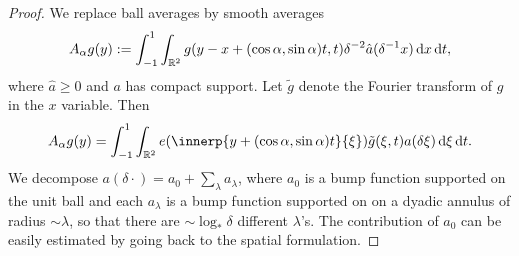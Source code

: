 \begin{proof}
We replace ball averages by smooth averages
\[
A_{\alpha}g(y)
:=
\int_{-1}^{1} \int_{\mathbb{R}^{2}} g(y-x+(\cos\alpha,\sin\alpha)t,t) \delta^{-2} \hat{a}(\delta^{-1}x) \mathop{}\!\mathrm{d} x \mathop{}\!\mathrm{d} t,
\]
where $\hat{a} \geq 0$ and $a$ has compact support.
Let $\tilde{g}$ denote the Fourier transform of $g$ in the $x$ variable.
Then
\[
A_{\alpha}g(y)
=
\int_{-1}^{1} \int_{\R^{2}} e(\innerp{y+(\cos\alpha,\sin\alpha)t}{\xi}) \tilde{g}(\xi,t) a(\delta \xi) \dif \xi \dif t.
\]
We decompose $a(\delta\cdot) = a_{0} + \sum_{\lambda}a_{\lambda}$, where $a_{0}$ is a bump function supported on the unit ball and each $a_{\lambda}$ is a bump function supported on on a dyadic annulus of radius $\sim\lambda$, so that there are $\sim \log_{*}\delta$ different $\lambda$'s.
The contribution of $a_{0}$ can be easily estimated by going back to the spatial formulation.


\end{proof}
